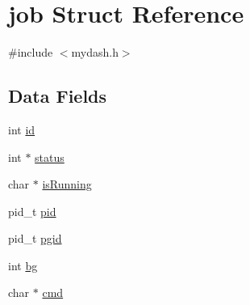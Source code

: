 \hypertarget{structjob}{\section{job Struct Reference}
\label{structjob}
}


{\ttfamily \#include $<$mydash.\-h$>$}

\subsection*{Data Fields}
\begin{DoxyCompactItemize}
\item 
int \hyperlink{structjob_a14f2a8b63b37554fd774fefa8e75608e}{id}
\item 
int $\ast$ \hyperlink{structjob_a6a8ce162e046e774fdbf319d96cfbf37}{status}
\item 
char $\ast$ \hyperlink{structjob_a3831d603820f85bc242b8f2a6de5dab2}{is\-Running}
\item 
pid\-\_\-t \hyperlink{structjob_ac933714dad42e15065544f503cbba8d5}{pid}
\item 
pid\-\_\-t \hyperlink{structjob_a16974ac47f6847a999db852190596573}{pgid}
\item 
int \hyperlink{structjob_a0bcf91a5eab3e72e05013ba164ed9f71}{bg}
\item 
char $\ast$ \hyperlink{structjob_aae40709790f87074b0d1b55b8b0c1abe}{cmd}
\end{DoxyCompactItemize}


